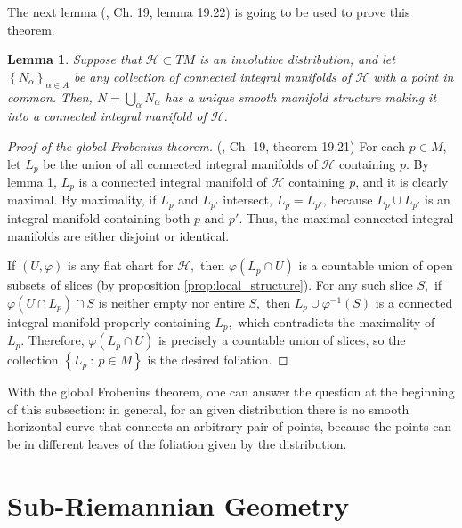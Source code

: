 \documentclass[12pt, letterpaper, reqno]{amsart}
\theoremstyle{definition}
\theoremstyle{plain}
\newtheorem{lm}{Lemma}
\theoremstyle{remark}
\begin{document}
The next lemma (\cite{lee2003introduction}, Ch. 19, lemma 19.22) is going to be used to prove this theorem.

\begin{lm}\label{lm:man_struct}
	Suppose that $ \mathcal{H}\subset TM $ is an involutive distribution, and let $ \left\{ N_\alpha \right\}_{\alpha\in A} $ be any collection of connected integral manifolds of $ \mathcal{H} $ with a point in common. Then, $ N=\bigcup_{\alpha} N_\alpha $ has a unique smooth manifold structure making it into a connected integral manifold of $ \mathcal{H}. $  
\end{lm}

\begin{proof}[Proof of the global Frobenius theorem]
	(\cite{lee2003introduction}, Ch. 19, theorem 19.21) For each $ p\in M $, let $ L_p $ be the union of all connected integral manifolds of $ \mathcal{H} $ containing $ p. $ By lemma \ref{lm:man_struct}, $ L_p $ is a connected integral manifold of $ \mathcal{H} $ containing $ p $, and it is clearly maximal. By maximality, if $ L_p $ and $ L_{p'} $ intersect, $ L_p=L_{p'} $, because $ L_p\cup L_{p'} $ is an integral manifold containing both $ p $ and $ p' $. Thus, the maximal connected integral manifolds are either disjoint or identical.    

	If $ (U,\varphi) $ is any flat chart for $ \mathcal{H}, $ then $ \varphi(L_p\cap U) $ is a countable union of open subsets of slices (by proposition \ref{prop:local_structure}). For any such slice $ S, $ if $ \varphi(U\cap L_p)\cap S $ is neither empty nor entire $ S, $ then $ L_p\cup \varphi^{-1}(S )$ is a connected integral manifold properly containing $ L_p, $ which contradicts the maximality of $ L_p. $ Therefore, $ \varphi(L_p\cap U) $ is precisely a countable union of slices, so the collection $ \left\{ L_p\ : \ p\in M \right\} $ is the desired foliation.
\end{proof}

With the global Frobenius theorem, one can answer the question at the beginning of this subsection: in general, for an given distribution there is no smooth horizontal curve that connects an arbitrary pair of points, because the points can be in different leaves of the foliation given by the distribution.


\section{Sub-Riemannian Geometry}%
\label{sec:sub-Riemannian_geometry}
\end{document}
